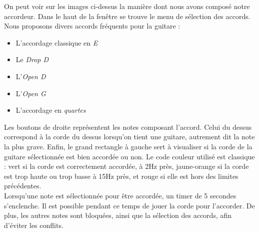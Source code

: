 On peut voir sur les images ci-dessus la manière dont nous avons composé notre accordeur. Dans le haut de la fenêtre se trouve le menu de sélection des accords. Nous proposons divers accords fréquents pour la guitare : 
\begin{itemize}
\item L'accordage classique en\textit{ E}
\item Le \textit{Drop D}
\item L'\textit{Open D}
\item L'\textit{Open G}
\item L'accordage en \textit{quartes}
\end{itemize}
Les boutons de droite représentent les notes composant l'accord. Celui du dessus correspond à la corde du dessus lorsqu'on tient une guitare, autrement dit la note la plus grave. Enfin, le grand rectangle à gauche sert à visualiser si la corde de la guitare sélectionnée est bien accordée ou non. Le code couleur utilisé est classique : vert si la corde est correctement accordée, à 2Hz près, jaune-orange si la corde est trop haute ou trop basse à 15Hz près, et rouge si elle est hors des limites précédentes.\\

Lorsqu'une note est sélectionnée pour être accordée, un timer de 5 secondes s'enclenche. Il est possible pendant ce temps de jouer la corde pour l'accorder. De plus, les autres notes sont bloquées, ainsi que la sélection des accords, afin d'éviter les conflits.

